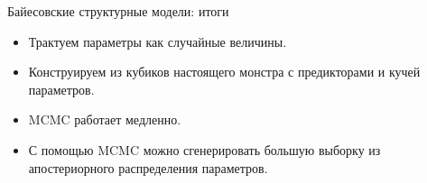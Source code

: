 \begin{frame}{Байесовские структурные модели: итоги}

  \begin{itemize}[<+->]
    \item Трактуем параметры как \alert{случайные величины}. 
    \item Конструируем из кубиков \alert{настоящего монстра} с предикторами и \alert{кучей} параметров.
    \item MCMC работает \alert{медленно}.
    \item С помощью MCMC можно сгенерировать большую выборку 
    из \alert{апостериорного} распределения параметров. 

  \end{itemize}
\end{frame}

